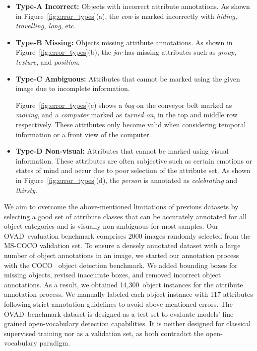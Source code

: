 \documentclass[10pt,twocolumn,letterpaper]{article}
\newcommand{\datasetname}{OVAD}
\newcommand{\nobjs}{14,300}
\begin{document}
\begin{itemize}\item \textbf{Type-A Incorrect:} Objects with incorrect attribute annotations. As shown in Figure~\ref{fig:error_types}(a), the \textit{cow} is marked incorrectly with \textit{hiding, travelling, long}, etc.

\item \textbf{Type-B Missing:} Objects missing attribute annotations. As shown in Figure~\ref{fig:error_types}(b), the \textit{jar} has missing attributes such as \textit{group, texture}, and \textit{position}.

\item \textbf{Type-C Ambiguous:} Attributes that cannot be marked using the given image due to incomplete information.

Figure~\ref{fig:error_types}(c) shows a \textit{bag} on the conveyor belt marked as \textit{moving}, and a \textit{computer} marked as \textit{turned on}, in the top and middle row respectively. These attributes only become valid when considering temporal information or a front view of the computer. 

\item \textbf{Type-D Non-visual:} Attributes that cannot be marked using visual information. These attributes are often subjective such as certain emotions or states of mind and occur due to poor selection of the attribute set.
As shown in Figure~\ref{fig:error_types}(d), the \textit{person} is annotated as \textit{celebrating} and \textit{thirsty}. 

\end{itemize}


We aim to overcome the above-mentioned limitations of previous datasets by selecting a good set of attribute classes that can be accurately annotated for all object categories and is visually non-ambiguous for most samples. 
Our \datasetname\ evaluation benchmark comprises 2000 images randomly selected from the MS-COCO \cite{coco} validation set. To ensure a densely annotated dataset with a large number of object annotations in an image, we started our annotation process with the COCO~\cite{coco} object detection benchmark. We added bounding boxes for missing objects, revised inaccurate boxes, and removed incorrect object annotations. 
As a result, we obtained \nobjs\ object instances for the attribute annotation process.
We manually labeled each object instance with 117 attributes following strict annotation guidelines to avoid above mentioned errors. 
The \datasetname\ benchmark dataset is designed as a test set to evaluate models' fine-grained open-vocabulary detection capabilities. It is neither designed for classical supervised training nor as a validation set, as both contradict the open-vocabulary paradigm. \\
 
\end{document}
